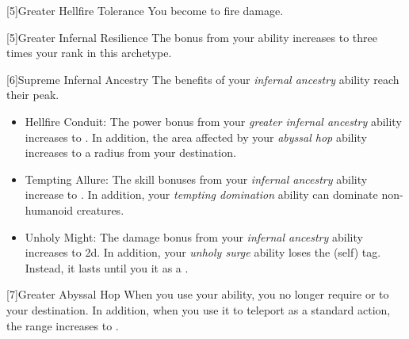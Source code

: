             [5]{Greater Hellfire Tolerance} You become  to fire damage.

            [5]{Greater Infernal Resilience}  The bonus from your  ability increases to three times your rank in this archetype.

            [6]{Supreme Infernal Ancestry} The benefits of your \textit{infernal ancestry} ability reach their peak.
            \begin{itemize}
                \item Hellfire Conduit: The power bonus from your \textit{greater infernal ancestry} ability increases to .
                    In addition, the area affected by your \textit{abyssal hop} ability increases to a \medarea radius from your destination.
                \item Tempting Allure: The skill bonuses from your \textit{infernal ancestry} ability increase to .
                    In addition, your \textit{tempting domination} ability can dominate non-humanoid creatures.
                \item Unholy Might: The damage bonus from your \textit{infernal ancestry} ability increases to \plus2d.
                    In addition, your \textit{unholy surge} ability loses the  (self) tag.
                    Instead, it lasts until you  it as a .
            \end{itemize}

            [7]{Greater Abyssal Hop} When you use your  ability, you no longer require  or  to your destination.
            In addition, when you use it to teleport as a standard action, the range increases to \distrange.



